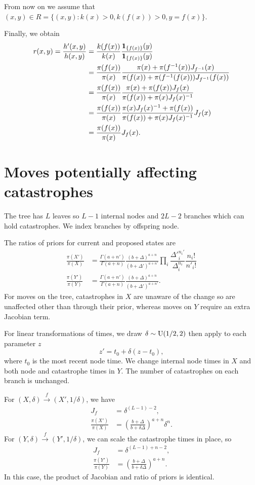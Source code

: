 \documentclass[11pt,a4paper]{article}
\newcommand{\Xp}{{X'}}
\newcommand{\pX}{\pi(X)}
\newcommand{\pXp}{\pi(\Xp)}
\newcommand{\Yp}{{Y'}}
\newcommand{\pY}{\pi(Y)}
\newcommand{\pYp}{\pi(\Yp)}
\renewcommand{\ni}{n_i}
\newcommand{\nip}{{n'}_i}
\newcommand{\Dp}{{\Delta'}}
\newcommand{\Di}{\Delta_i}
\newcommand{\Dip}{{\Delta'}_i}
\begin{document}
From now on we assume that $ (x, y) \in R = \{(x, y) : k(x) > 0, k(f(x)) > 0, y = f(x)\} $.

Finally, we obtain
\begin{align*}
    r(x, y)
        = \frac{h'(x, y)}{h(x, y)}
        &= \frac{k(f(x))}{k(x)} \frac{\mathbf{1}_{\{f(x)\}}(y)}{\mathbf{1}_{\{f(x)\}}(y)} \\
        &= \frac{\pi(f(x))}{\pi(x)} \frac{\pi(x) + \pi(f^{-1}(x)) J_{f^{-1}}(x)}{\pi(f(x)) + \pi(f^{-1}(f(x))) J_{f^{-1}}(f(x))} \\
        &= \frac{\pi(f(x))}{\pi(x)} \frac{\pi(x) + \pi(f(x)) J_f(x)}{\pi(f(x)) + \pi(x) J_f(x)^{-1}} \\
        &= \frac{\pi(f(x))}{\pi(x)} \frac{\pi(x) J_f(x)^{-1} + \pi(f(x))}{\pi(f(x)) + \pi(x) J_f(x)^{-1}} J_f(x) \\
        &= \frac{\pi(f(x))}{\pi(x)} J_f(x).
\end{align*}

\section{Moves potentially affecting catastrophes}

The tree has $ L $ leaves so $ L - 1 $ internal nodes and $ 2L - 2 $ branches which can hold catastrophes. We index branches by offspring node.

The ratios of priors for current and proposed states are
\begin{align*}
    \frac{\pXp}{\pX}
        &= \frac{\Gamma(a + n')}{\Gamma(a + n)} \frac{(b + \Delta)^{a + n}}{(b + \Dp)^{a + n'}} \prod_i \dfrac{\Dip^{\ni'}}{\Di^{\ni}} \dfrac{\ni!}{\nip!} \\
    \frac{\pYp}{\pY}
        &= \frac{\Gamma(a + n')}{\Gamma(a + n)} \frac{(b + \Delta)^{a + n}}{(b + \Dp)^{a + n'}}.
\end{align*}
For moves on the tree, catastrophes in $ X $ are unaware of the change so are unaffected other than through their prior, whereas moves on $ Y $ require an extra Jacobian term.

For linear transformations of times, we draw $ \delta \sim \mathrm{U}(1/2, 2) $ then apply to each parameter $ z $
\[
    z' = t_0 + \delta(z - t_0),
\]
where $ t_0 $ is the most recent node time. We change internal node times in $ X $ and both node and catastrophe times in $ Y $. The number of catastrophes on each branch is unchanged.

For $ (X, \delta) \xrightarrow{f} (X', 1 / \delta) $, we have
\begin{align*}
    J_f &= \delta^{(L - 1) - 2}, \\
    \frac{\pXp}{\pX}
        &= \left(\frac{b + \Delta}{b + \delta \Delta}\right)^{a + n} \delta^n.
\end{align*}
For $ (Y, \delta) \xrightarrow{f} (Y', 1 / \delta) $, we can scale the catastrophe times in place, so
\begin{align*}
    J_f &= \delta^{(L - 1) + n - 2}, \\
    \frac{\pYp}{\pY}
        &= \left(\frac{b + \Delta}{b + \delta \Delta}\right)^{a + n}.
\end{align*}
In this case, the product of Jacobian and ratio of priors is identical.
\end{document}
